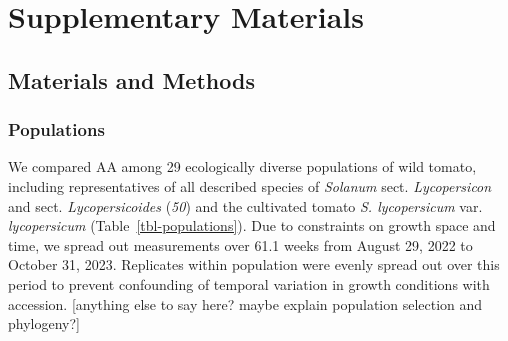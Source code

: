 \documentclass[
  letterpaper,
  DIV=11,
  numbers=noendperiod]{scrartcl}
\newcommand{\aax}{$\mathrm{AA}$}
\begin{document}
\newpage{}

\section{Supplementary Materials}\label{supplementary-materials}

\renewcommand{\thefigure}{S\arabic{figure}}
\renewcommand{\thetable}{S\arabic{table}}
\renewcommand{\theequation}{S\arabic{equation}}
\setcounter{figure}{0}
\setcounter{table}{0}
\setcounter{equation}{0}

\subsection{Materials and Methods}\label{sec-methods}

\subsubsection{Populations}\label{populations}

We compared \aax{} among 29 ecologically diverse populations of wild
tomato, including representatives of all described species of
\emph{Solanum} sect. \emph{Lycopersicon} and sect.
\emph{Lycopersicoides} (\emph{50}) and the cultivated tomato \emph{S.
lycopersicum} var. \emph{lycopersicum} (Table~\ref{tbl-populations}).
Due to constraints on growth space and time, we spread out measurements
over 61.1 weeks from August 29, 2022 to October 31, 2023. Replicates
within population were evenly spread out over this period to prevent
confounding of temporal variation in growth conditions with accession.
{[}anything else to say here? maybe explain population selection and
phylogeny?{]}
\end{document}
